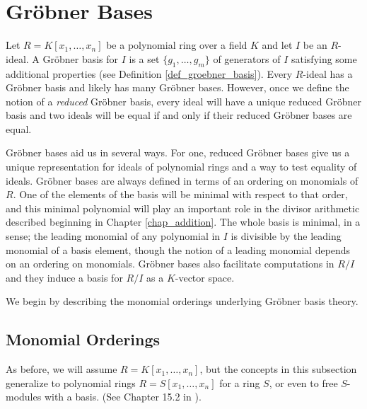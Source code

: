 

\section{Gr\"obner Bases}
\label{chap_groebner}

Let $R = K[x_1, \ldots, x_n]$ be a polynomial ring over a field $K$
and let $I$ be an $R$-ideal.
A Gr\"obner basis for $I$ is a set $\{g_1, \ldots, g_m\}$ of generators of $I$
satisfying some additional properties (see Definition \ref{def_groebner_basis}).
Every $R$-ideal has a Gr\"obner basis and likely has many Gr\"obner bases.
However, once we define the notion of a \emph{reduced} Gr\"obner basis,
every ideal will have a unique reduced Gr\"obner basis
and two ideals will be equal if and only if their reduced Gr\"obner bases are equal.

Gr\"obner bases aid us in several ways.
For one, reduced Gr\"obner bases give us a unique representation for ideals of polynomial rings
and a way to test equality of ideals.
Gr\"obner bases are always defined in terms of an ordering on monomials of $R$.
One of the elements of the basis will be minimal with respect to that order,
and this minimal polynomial will play an important role in the divisor arithmetic
described beginning in Chapter \ref{chap_addition}.
The whole basis is minimal, in a sense; 
the leading monomial of any polynomial in $I$ is divisible by the leading monomial of a basis element,
though the notion of a leading monomial depends on an ordering on monomials.
Gr\"obner bases also facilitate computations in $R/I$ and they induce a basis for $R/I$ as a $K$-vector space.

We begin by describing the monomial orderings underlying Gr\"obner basis theory.




\subsection{Monomial Orderings}

As before, we will assume $R = K[x_1, \ldots, x_n]$,
but the concepts in this subsection generalize to polynomial rings $R = S[x_1, \ldots, x_n]$ for a ring $S$,
or even to free $S$-modules with a basis. (See Chapter 15.2 in \cite{eisenbud95}).


